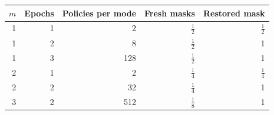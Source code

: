 \begin{tabular}{rrrrr}
\toprule
$m$ & Epochs & Policies per mode & Fresh masks & Restored mask \\
\midrule
1 & 1 & 2 & $\frac{1}{2}$ & $\frac{1}{2}$ \\
1 & 2 & 8 & $\frac{1}{2}$ & 1 \\
1 & 3 & 128 & $\frac{1}{2}$ & 1 \\
2 & 1 & 2 & $\frac{1}{4}$ & $\frac{1}{4}$ \\
2 & 2 & 32 & $\frac{1}{4}$ & 1 \\
3 & 2 & 512 & $\frac{1}{8}$ & 1 \\
\bottomrule
\end{tabular}
